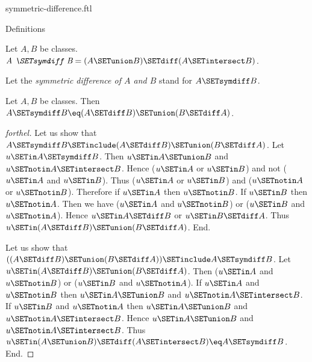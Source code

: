 \documentclass{stex}
\begin{document}
\begin{smodule}{symmetric-difference.ftl}

\begin{sfragment}{Definitions}
  \begin{definition}[forthel,id=FOUNDATIONS_03_7457594151010304]
    Let $A, B$ be classes.
    $\emph{A \SETsymdiff B} = (A \SETunion B) \SETdiff (A \SETintersect B)$.

    Let the \emph{symmetric difference of $A$ and $B$} stand for $A \SETsymdiff B$.
  \end{definition}

  \begin{proposition}[forthel,id=FOUNDATIONS_03_4886447211413504]
    Let $A, B$ be classes.
    Then $A \SETsymdiff B \eq (A \SETdiff B) \SETunion (B \SETdiff A)$.
  \end{proposition}
  \begin{proof}[forthel]
    Let us show that $A \SETsymdiff B \SETinclude (A \SETdiff B) \SETunion (B \SETdiff A)$.
      Let $u \SETin A \SETsymdiff B$.
      Then $u \SETin A \SETunion B$ and $u \SETnotin A \SETintersect B$.
      Hence ($u \SETin A$ or $u \SETin B$) and not ($u \SETin A$ and $u \SETin B$).
      Thus ($u \SETin A$ or $u \SETin B$) and ($u \SETnotin A$ or $u \SETnotin B$).
      Therefore if $u \SETin A$ then $u \SETnotin B$.
      If $u \SETin B$ then $u \SETnotin A$.
      Then we have ($u \SETin A$ and $u \SETnotin B$) or ($u \SETin B$ and $u \SETnotin A$).
      Hence $u \SETin A \SETdiff B$ or $u \SETin B \SETdiff A$.
      Thus $u \SETin (A \SETdiff B) \SETunion (B \SETdiff A)$.
    End.

    Let us show that $((A \SETdiff B) \SETunion (B \SETdiff A)) \SETinclude A \SETsymdiff B$. %
      Let $u \SETin (A \SETdiff B) \SETunion (B \SETdiff A)$.
      Then ($u \SETin A$ and $u \SETnotin B$) or ($u \SETin B$ and $u \SETnotin A$).
      If $u \SETin A$ and $u \SETnotin B$ then $u \SETin A \SETunion B$ and $u \SETnotin A \SETintersect B$.
      If $u \SETin B$ and $u \SETnotin A$ then $u \SETin A \SETunion B$ and $u \SETnotin A \SETintersect B$.
      Hence $u \SETin A \SETunion B$ and $u \SETnotin A \SETintersect B$.
      Thus $u \SETin (A \SETunion B) \SETdiff (A \SETintersect B) \eq A \SETsymdiff B$.
    End.
  \end{proof}
\end{sfragment}


\end{smodule}
\end{document}

